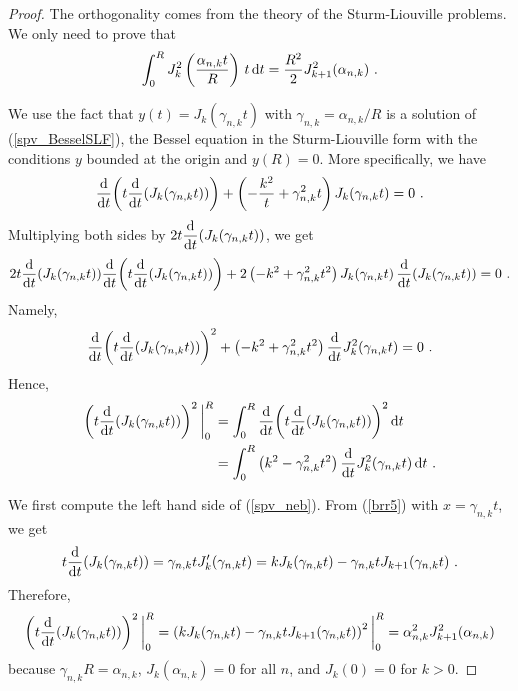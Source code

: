 \begin{proof}
The orthogonality comes from the theory of the Sturm-Liouville problems.
We only need to prove that
\begin{equation}\label{spv_nebi}
\int_0^R J_k^2\left(\frac{\alpha_{n,k} t}{R}\right)\, t \dx{t} =
\frac{R^2}{2} J_{k+1}^2(\alpha_{n,k}) \ .
\end{equation}

We use the fact that $\displaystyle y(t) = J_k(\gamma_{n,k}t)$ with
$\gamma_{n,k} = \alpha_{n,k}/R$ is a solution of
(\ref{spv_BesselSLF}), the Bessel equation in the Sturm-Liouville
form with the conditions $y$ bounded at the origin and $y(R)=0$.
More specifically, we have
\[
\dfdx{\left( t \dfdx{\left(J_k(\gamma_{n,k}t)\right)}{t} \right)}{t}
+ \left( -\frac{k^2}{t} + \gamma_{n,k}^2 t\right) J_k(\gamma_{n,k}t) = 0 \ .
\]
Multiplying both sides by
$\displaystyle 2 t \dfdx{\left( J_k(\gamma_{n,k}t)\right)}{t}$, we get
\[
2 t \dfdx{\left( J_k(\gamma_{n,k}t) \right)}{t}
\dfdx{\left( t \dfdx{\left(J_k(\gamma_{n,k}t)\right)}{t}\right)}{t}
+ 2\left( -k^2 + \gamma_{n,k}^2 t^2\right)
J_k(\gamma_{n,k}t)\, \dfdx{\left( J_k(\gamma_{n,k}t)\right)}{t} = 0 \ .
\]
Namely,
\[
\dfdx{\left( t \dfdx{\left(J_k(\gamma_{n,k}t)\right)}{t}\right)^2}{t} 
+ \left(- k^2 + \gamma_{n,k}^2 t^2\right)
\dfdx{ J_k^2(\gamma_{n,k}t)}{t} = 0 \ .
\]
Hence,
\begin{equation}\label{spv_neb}
\begin{split}
\left( t \dfdx{\left(J_k(\gamma_{n,k}t)\right)}{t}\right)^2\bigg|_0^R
& = \int_0^R
\dfdx{\left( t \dfdx{\left(J_k(\gamma_{n,k}t)\right)}{t}\right)^2}{t} \dx{t}\\
&= \int_0^R \left(k^2 - \gamma_{n,k}^2 t^2\right)
\dfdx{ J_k^2(\gamma_{n,k}t)}{t} \dx{t} \ .
\end{split}
\end{equation}

We first compute the left hand side of (\ref{spv_neb}).  From
(\ref{brr5}) with $x=\gamma_{n,k}t$, we get
\[
t \dfdx{\left( J_k(\gamma_{n,k}t) \right)}{t} 
= \gamma_{n,k}t J_k'(\gamma_{n,k}t)
= k J_k(\gamma_{n,k}t) - \gamma_{n,k}t J_{k+1}(\gamma_{n,k}t) \ .
\]
Therefore,
\[
\left( t \dfdx{\left(J_k(\gamma_{n,k}t)\right)}{t}\right)^2\bigg|_0^R
= \left( k J_k(\gamma_{n,k}t)
- \gamma_{n,k}t J_{k+1}(\gamma_{n,k}t) \right)^2\bigg|_0^R \\
= \alpha_{n,k}^2 J_{k+1}^2(\alpha_{n,k})
\]
because $\gamma_{n,k}R = \alpha_{n,k}$, $J_k(\alpha_{n,k})=0$ for
all $n$, and $J_k(0) = 0$ for $k>0$.


\end{proof}
